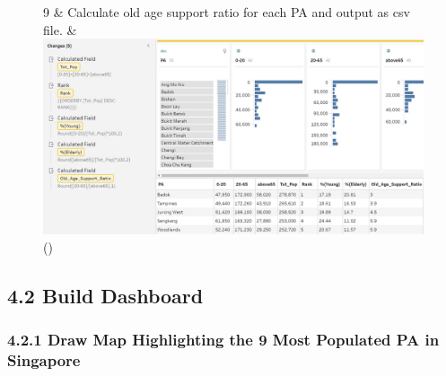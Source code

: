 \documentclass[
  letterpaper,
  DIV=11,
  numbers=noendperiod,
  oneside]{scrartcl}
\begin{document}
\begin{figure}
\begin{longtable}[]
9 & Calculate old age support ratio for each PA and output as csv file.
& \includegraphics{images/9.jpg} \\
\bottomrule()
\end{longtable}

\end{figure}

\hypertarget{build-dashboard}{%
\subsection{4.2 Build Dashboard}\label{build-dashboard}}

\hypertarget{draw-map-highlighting-the-9-most-populated-pa-in-singapore}{%
\subsubsection{4.2.1 Draw Map Highlighting the 9 Most Populated PA in
Singapore}\label{draw-map-highlighting-the-9-most-populated-pa-in-singapore}}
\end{document}
